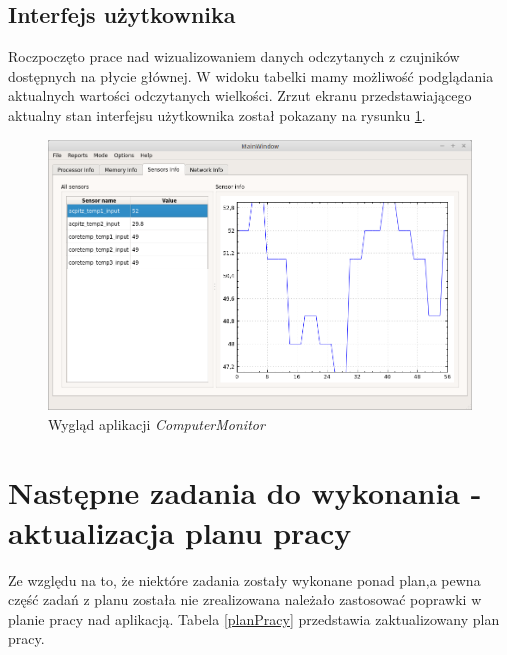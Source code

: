 \documentclass[a4paper]{article}
\begin{document}
\subsection{Interfejs użytkownika}
Roczpoczęto prace nad wizualizowaniem danych  odczytanych z czujników dostępnych na płycie głównej.
W widoku tabelki mamy możliwość podglądania aktualnych wartości odczytanych wielkości. Zrzut ekranu przedstawiającego aktualny stan interfejsu użytkownika został pokazany na rysunku \ref{wygladAplikacji}.

\begin{figure}[h]
	\centering
	\includegraphics[width=\linewidth]{img/wygladAplikacji.png}
	\caption{Wygląd aplikacji \textit{ComputerMonitor}}
	\label{wygladAplikacji}
\end{figure}


\section{Następne zadania do wykonania - aktualizacja planu pracy}
Ze względu na to, że niektóre zadania zostały wykonane ponad plan,a pewna część zadań z planu została nie zrealizowana należało zastosować poprawki w planie pracy nad aplikacją. Tabela \ref{planPracy} przedstawia zaktualizowany plan pracy.
\end{document}
